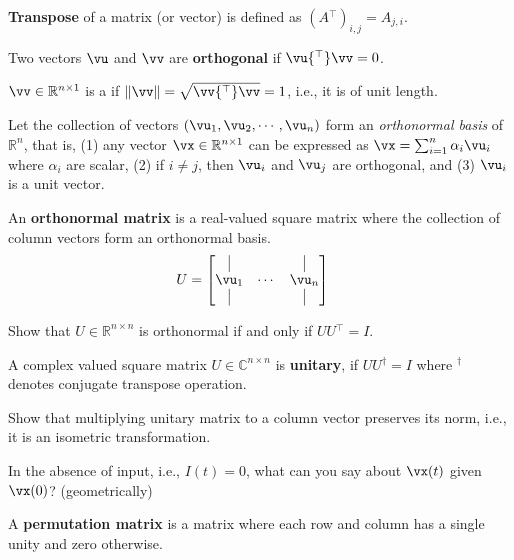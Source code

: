 \documentclass[a4paper,11pt]{exam}
\newcounter{ct}
\newcommand{\trp}{{^\top}} %
\newcommand{\ctrp}{{^\dagger}} %
\newcommand{\norm}[1]{\ensuremath{\Vert{#1}\Vert}}
\newcommand{\field}[1]{\ensuremath{\mathbb{#1}}}
\newcommand{\reals}{\field{R}}
\newcommand{\complex}{\field{C}}
\begin{document}
\begin{questions}
\newpage
\begin{tcolorbox}
    \textbf{Transpose} of a matrix (or vector) is defined as $(A\trp)_{i,j} = A_{j,i}$.
\end{tcolorbox}
\begin{tcolorbox}
    Two vectors $\vu$ and $\vv$ are \textbf{orthogonal} if $\vu\trp \vv = 0$.
\end{tcolorbox}
\begin{tcolorbox}
    $\vv \in \reals^{n \times 1}$ is a  if $\norm{\vv} = \sqrt{\vv\trp \vv} = 1$, i.e., it is of unit length.
\end{tcolorbox}

Let the collection of vectors $(\vu_1, \vu_2, \cdots, \vu_n)$ form an \textit{orthonormal basis} of $\reals^n$, that is,
(1) any vector $\vx \in \reals^{n \times 1}$ can be expressed as $\vx = \sum_{i=1}^n \alpha_i \vu_i$ where $\alpha_i$ are scalar,
(2) if $i \neq j$, then $\vu_i$ and $\vu_j$ are orthogonal,
and
(3) $\vu_i$ is a unit vector.

An \textbf{orthonormal matrix} is a real-valued square matrix where the collection of column vectors form an orthonormal basis.
\begin{align}\label{eq:LA:orthonormal}
U &=
    \begin{bmatrix}
	\kern.3em\vline\kern.3em
	&
	&
	\kern.3em\vline\kern.3em
	\\
	\vu_1 & \cdots & \vu_n \\
	\kern.3em\vline\kern.3em
	&
	&
	\kern.3em\vline\kern.3em
    \end{bmatrix}
\end{align}

\question Show that $U \in \reals^{n \times n}$ is orthonormal if and only if $U U\trp = I$.

A complex valued square matrix $U \in \complex^{n \times n}$ is \textbf{unitary}, if $U U\ctrp = I$ where $\ctrp$ denotes conjugate transpose operation.

\question Show that multiplying unitary matrix to a column vector preserves its norm, i.e., it is an isometric transformation.

\question In the absence of input, i.e., $I(t) = 0$, what can you say about $\vx(t)$ given $\vx(0)$? (geometrically)

A \textbf{permutation matrix} is a matrix where each row and column has a single unity and zero otherwise.


\end{questions}
\end{document}
